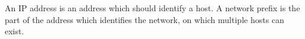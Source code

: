 An IP address is an address which should identify a host. A network prefix is the part of the address which identifies the network, on which multiple hosts can exist.
